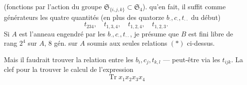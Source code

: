 (fonctions  par l'action du groupe
$\mathfrak S_{\{i,j,k\}}\subset\mathfrak S_4$).
 qu'en fait, il suffit comme générateurs les quatre quantités
(en plus des quatorze $b_\cdot,c_\cdot,t_{\cdot\cdot}$ du début)
\[
t_{234},\quad t_{1,3,4},\quad t_{1,2,4},\quad t_{1,2,3}.
\]
Si $A$ est l'anneau engendré par les $b_\cdot,c_\cdot,t_{\cdot\cdot}$,
je présume que $B$ est fini libre de rang $2^4$ sur $A$, 
$8$ gén. sur $A$ soumis aux seules relations $(*)$ ci-dessus.

Mais il faudrait trouver la relation entre les $b_i,c_j,t_{k,l}$ --- peut-être via les
$t_{ijk}$. La clef pour la trouver  le calcul de l'expression
\[
\operatorname{Tr}x_1x_2x_3x_4
\]
